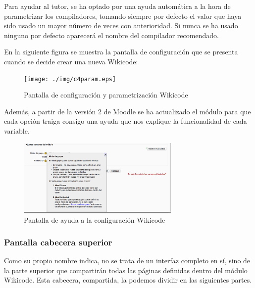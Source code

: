 Para ayudar al tutor, se ha optado por una ayuda automática a la hora de parametrizar los compiladores, tomando siempre por defecto el valor que haya sido usado un mayor número de veces con anterioridad. Si nunca se ha usado ninguno por defecto aparecerá el nombre del compilador recomendado.

\newpage

En la siguiente figura se muestra la pantalla de configuración que se presenta cuando se decide crear una nueva Wikicode:

\begin{figure}[h]
	\centering
	\texttt{[image: ./img/c4param.eps]}
	\caption{Pantalla de configuración y parametrización Wikicode}
\end{figure}

Además, a partir de la versión 2 de Moodle se ha actualizado el módulo para que cada opción traiga consigo una ayuda que nos explique la funcionalidad de cada variable.

\begin{figure}[h]
	\centering
	\includegraphics[width=0.7\textwidth]{./img/c4paramhelp.eps}
	\caption{Pantalla de ayuda a la configuración Wikicode}
\end{figure}

\newpage

\subsubsection{Pantalla cabecera superior}

Como su propio nombre indica, no se trata de un interfaz completo en sí, sino de la parte superior que compartirán todas las páginas definidas dentro del módulo Wikicode. Esta cabecera, compartida, la podemos dividir en las siguientes partes.

